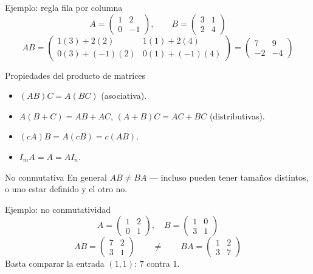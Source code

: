 \documentclass[11pt]{beamer}
\begin{document}
\begin{frame}{Ejemplo: regla fila por columna}
  \[
    A=\begin{pmatrix}1&2\\0&-1\end{pmatrix}, \qquad B=\begin{pmatrix}3&1\\2&4\end{pmatrix}
  \]
  \[
    AB = \begin{pmatrix}1(3)+2(2) & 1(1)+2(4)\\0(3)+(-1)(2) & 0(1)+(-1)(4)\end{pmatrix}
    = \begin{pmatrix}7&9\\-2&-4\end{pmatrix}
  \]
\end{frame}

\begin{frame}{Propiedades del producto de matrices}
  \begin{itemize}
    \item $(AB)C=A(BC)$ (asociativa).
    \item $A(B+C)=AB+AC$, $(A+B)C=AC+BC$ (distributivas).
    \item $(cA)B=A(cB)=c(AB)$.
    \item $I_mA=A=AI_n$.
  \end{itemize}
  \begin{alertblock}{No conmutativa}
    En general $AB\neq BA$ --- incluso pueden tener tamaños distintos, o uno estar definido y el
    otro no.
  \end{alertblock}
\end{frame}

\begin{frame}{Ejemplo: no conmutatividad}
  \[
    A=\begin{pmatrix}1&2\\0&1\end{pmatrix}, \quad B=\begin{pmatrix}1&0\\3&1\end{pmatrix}
  \]
  \[
    AB=\begin{pmatrix}7&2\\3&1\end{pmatrix} \qquad\neq\qquad BA=\begin{pmatrix}1&2\\3&7\end{pmatrix}
  \]
  Basta comparar la entrada $(1,1)$: $7$ contra $1$.
\end{frame}
\end{document}

